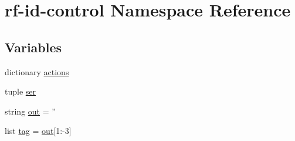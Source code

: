 \hypertarget{namespacerf-id-control}{\section{rf-\/id-\/control Namespace Reference}
\label{namespacerf-id-control}
}
\subsection*{Variables}
\begin{DoxyCompactItemize}
\item 
dictionary \hyperlink{namespacerf-id-control_a44ce566fe9439db91445bbacc055dfba}{actions}
\item 
tuple \hyperlink{namespacerf-id-control_ad75e60402f9b3cb86ddbce12f4c99256}{ser}
\item 
string \hyperlink{namespacerf-id-control_a340302d5b6d011871e45b3b847dab3a6}{out} = ''
\item 
list \hyperlink{namespacerf-id-control_a10a094d39156477476efd89f406dae97}{tag} = \hyperlink{namespacerf-id-control_a340302d5b6d011871e45b3b847dab3a6}{out}\mbox{[}1\-:-\/3\mbox{]}
\end{DoxyCompactItemize}


